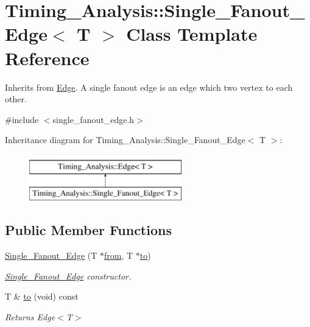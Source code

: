 \hypertarget{classTiming__Analysis_1_1Single__Fanout__Edge}{\section{Timing\-\_\-\-Analysis\-:\-:Single\-\_\-\-Fanout\-\_\-\-Edge$<$ T $>$ Class Template Reference}
\label{classTiming__Analysis_1_1Single__Fanout__Edge}
}


Inherits from \hyperlink{classTiming__Analysis_1_1Edge}{Edge}. A single fanout edge is an edge which two vertex to each other.  




{\ttfamily \#include $<$single\-\_\-fanout\-\_\-edge.\-h$>$}

Inheritance diagram for Timing\-\_\-\-Analysis\-:\-:Single\-\_\-\-Fanout\-\_\-\-Edge$<$ T $>$\-:\begin{figure}[H]
\begin{center}
\leavevmode
\includegraphics[height=2.000000cm]{classTiming__Analysis_1_1Single__Fanout__Edge}
\end{center}
\end{figure}
\subsection*{Public Member Functions}
\begin{DoxyCompactItemize}
\item 
\hyperlink{classTiming__Analysis_1_1Single__Fanout__Edge_ac588152ff213288a57a744374039790a}{Single\-\_\-\-Fanout\-\_\-\-Edge} (T $\ast$\hyperlink{classTiming__Analysis_1_1Edge_a47020ea89fd9fde438adc814a731a23d}{from}, T $\ast$\hyperlink{classTiming__Analysis_1_1Single__Fanout__Edge_ac01deccce158b6cee6883924e6dcb788}{to})
\begin{DoxyCompactList}\small\item\em \hyperlink{classTiming__Analysis_1_1Single__Fanout__Edge}{Single\-\_\-\-Fanout\-\_\-\-Edge} constructor. \end{DoxyCompactList}\item 
T \& \hyperlink{classTiming__Analysis_1_1Single__Fanout__Edge_ac01deccce158b6cee6883924e6dcb788}{to} (void) const 
\begin{DoxyCompactList}\small\item\em Returns Edge$<$\-T$>$ \end{DoxyCompactList}\end{DoxyCompactItemize}

